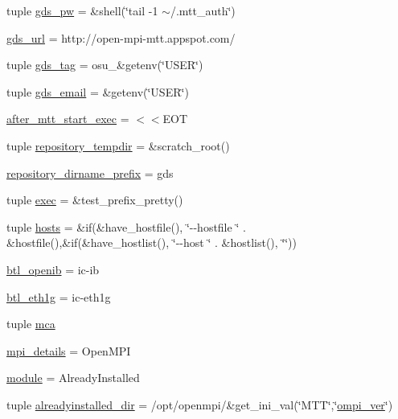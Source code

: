 \begin{DoxyCompactItemize}
\item 
tuple \hyperlink{namespacegds-demo_ae8f847cfa457e3ef0c5fa370200cf06c}{gds\-\_\-pw} = \&shell(\char`\"{}tail -\/1 $\sim$/.mtt\-\_\-auth\char`\"{})
\item 
\hyperlink{namespacegds-demo_a9d1bc7e10684b9a35809bd57826a72eb}{gds\-\_\-url} = http\-://open-\/mpi-\/mtt.\-appspot.\-com/
\item 
tuple \hyperlink{namespacegds-demo_a89bef1abf605d724804682af1e5a0fb4}{gds\-\_\-tag} = osu\-\_\-\&getenv(\char`\"{}U\-S\-E\-R\char`\"{})
\item 
tuple \hyperlink{namespacegds-demo_a46212fa747c3d30872b524a4c5c62084}{gds\-\_\-email} = \&getenv(\char`\"{}U\-S\-E\-R\char`\"{})
\item 
\hyperlink{namespacegds-demo_a843952a47656e27f99b11351112482cc}{after\-\_\-mtt\-\_\-start\-\_\-exec} = $<$$<$E\-O\-T
\item 
tuple \hyperlink{namespacegds-demo_a963db84d8e885972e94d04061614763f}{repository\-\_\-tempdir} = \&scratch\-\_\-root()
\item 
\hyperlink{namespacegds-demo_a2840f90f55bf220489772c7ec78979da}{repository\-\_\-dirname\-\_\-prefix} = gds
\item 
tuple \hyperlink{namespacegds-demo_a860b0b1622e13aba647a797f1e3335cb}{exec} = \&test\-\_\-prefix\-\_\-pretty()
\item 
tuple \hyperlink{namespacegds-demo_a5d35655c0d94700bdf5cd1c850d5629f}{hosts} = \&if(\&have\-\_\-hostfile(), \char`\"{}-\/-\/hostfile \char`\"{} . \&hostfile(),\&if(\&have\-\_\-hostlist(), \char`\"{}-\/-\/host \char`\"{} . \&hostlist(), \char`\"{}\char`\"{}))
\item 
\hyperlink{namespacegds-demo_aeadba89193ad7b62e80b8c3a321f46d2}{btl\-\_\-openib} = ic-\/ib
\item 
\hyperlink{namespacegds-demo_a1a98caf64f4d8ec3980fda04116bb978}{btl\-\_\-eth1g} = ic-\/eth1g
\item 
tuple \hyperlink{namespacegds-demo_ae28af619e6658a48dc7674284fbde2e0}{mca}
\item 
\hyperlink{namespacegds-demo_a9dc2cdce477d3c17556857b0fd695d01}{mpi\-\_\-details} = Open\-M\-P\-I
\item 
\hyperlink{namespacegds-demo_afb50f91266d15d79ce91d59cd80b8369}{module} = Already\-Installed
\item 
tuple \hyperlink{namespacegds-demo_a7d7eb3eb651697eb48935ef101d672b3}{alreadyinstalled\-\_\-dir} = /opt/openmpi/\&get\-\_\-ini\-\_\-val(\char`\"{}M\-T\-T\char`\"{},\char`\"{}\hyperlink{namespacegds-demo_aa7b4ee1aa52c894100818af632edc7dc}{ompi\-\_\-ver}\char`\"{})
$$
\end{DoxyCompactItemize}
